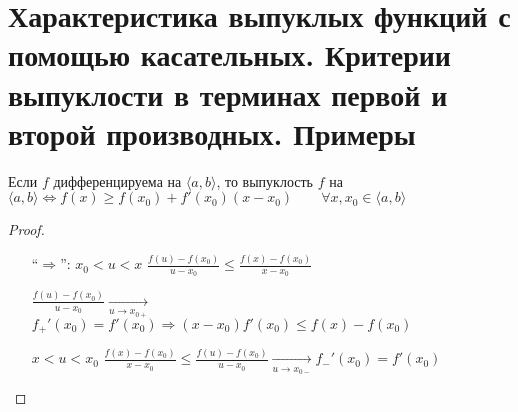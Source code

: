 \section{Характеристика выпуклых функций с помощью касательных. Критерии выпуклости в терминах первой и второй производных. Примеры \href{https://youtu.be/CAxh8kYEOlQ?t=6210}{\Walley}}
\begin{theorem-non}
    Если $f$ дифференцируема на $\langle a, b \rangle$, то выпуклость $f$ на $\langle a, b \rangle \Longleftrightarrow
    f(x) \geqslant f(x_0) + f'(x_0)(x - x_0) \qquad \forall x, x_0 \in \langle a, b \rangle $


    \begin{proof} \quad 

        \begin{itemize}
            \item[``$\Longrightarrow$'':] $x_0 < u < x$ \qquad 
            $\frac{f(u) - f(x_0)}{u - x_0} \leqslant \frac{f(x) - f(x_0)}{x - x_0}$

            $\frac{f(u) - f(x_0)}{u - x_0} \underset{u \rightarrow x_{0+}}{\longrightarrow}$
            $f_{+}'(x_0) = f'(x_0) \Longrightarrow (x - x_0)f'(x_0) \leqslant f(x) - f(x_0)$

            $x < u < x_0$ \qquad 
            $\frac{f(x) - f(x_0)}{x - x_0} \leqslant \frac{f(u) - f(x_0)}{u - x_0}
            \underset{u \rightarrow x_{0-}}{\longrightarrow}
            f_{-}'(x_0) = f'(x_0)$
            

\end{itemize}
\end{proof}
\end{theorem-non}
